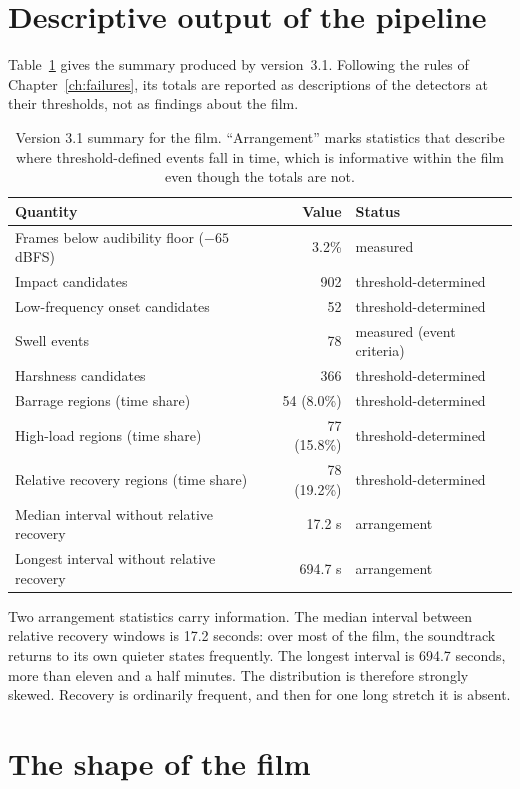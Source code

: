 \section{Descriptive output of the pipeline}

Table~\ref{tab:v31} gives the summary produced by version~3.1. Following the rules of Chapter~\ref{ch:failures}, its totals are reported as descriptions of the detectors at their thresholds, not as findings about the film.

\begin{table}[htbp]\centering\small
\begin{tabular}{lrl}
\toprule
Quantity & Value & Status \\
\midrule
Frames below audibility floor ($-65$ dBFS) & 3.2\% & measured \\
Impact candidates & 902 & threshold-determined \\
Low-frequency onset candidates & 52 & threshold-determined \\
Swell events & 78 & measured (event criteria) \\
Harshness candidates & 366 & threshold-determined \\
Barrage regions (time share) & 54 (8.0\%) & threshold-determined \\
High-load regions (time share) & 77 (15.8\%) & threshold-determined \\
Relative recovery regions (time share) & 78 (19.2\%) & threshold-determined \\
Median interval without relative recovery & 17.2 s & arrangement \\
Longest interval without relative recovery & 694.7 s & arrangement \\
\bottomrule
\end{tabular}
\caption{Version 3.1 summary for the film. ``Arrangement'' marks statistics that describe where threshold-defined events fall in time, which is informative within the film even though the totals are not.}\label{tab:v31}
\end{table}

Two arrangement statistics carry information. The median interval between relative recovery windows is 17.2 seconds: over most of the film, the soundtrack returns to its own quieter states frequently. The longest interval is 694.7 seconds, more than eleven and a half minutes. The distribution is therefore strongly skewed. Recovery is ordinarily frequent, and then for one long stretch it is absent.

\section{The shape of the film}

